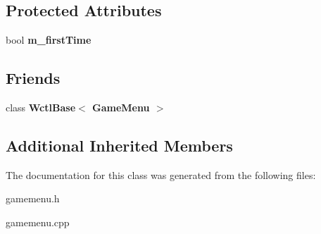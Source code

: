 \subsection*{Protected Attributes}
\begin{DoxyCompactItemize}
\item 
bool {\bfseries m\+\_\+first\+Time}\hypertarget{classGameMenu_a18e24a0f39544a292a4152d10bcd309f}{}\label{classGameMenu_a18e24a0f39544a292a4152d10bcd309f}

\end{DoxyCompactItemize}
\subsection*{Friends}
\begin{DoxyCompactItemize}
\item 
class {\bfseries Wctl\+Base$<$ Game\+Menu $>$}\hypertarget{classGameMenu_a1281c4248374b0cecefdfb3019c0f9a6}{}\label{classGameMenu_a1281c4248374b0cecefdfb3019c0f9a6}

\end{DoxyCompactItemize}
\subsection*{Additional Inherited Members}


The documentation for this class was generated from the following files\+:\begin{DoxyCompactItemize}
\item 
gamemenu.\+h\item 
gamemenu.\+cpp\end{DoxyCompactItemize}
